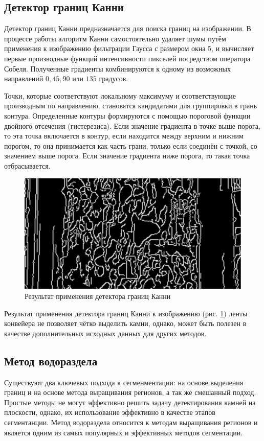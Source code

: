 \documentclass[times]{itmo-student-thesis}
\begin{document}
\subsection{Детектор границ Канни}\label{Canny}
Детектор границ Канни предназначается для поиска границ на изображении. В процессе работы алгоритм Канни самостоятельно удаляет шумы путём применения к изображению фильтрации Гаусса с размером окна 5, и вычисляет первые производные функций интенсивности пикселей посредством оператора Собеля. Полученные градиенты комбинируются к одному из возможных направлений $0, 45, 90$ или $135$ градусов. 

Точки, которые соответствуют локальному максимуму  и соответствующие производным по направлению, становятся кандидатами для группировки в грань контура. Определенные контуры формируются с помощью пороговой функции двойного отсечения (гистерезиса). Если значение градиента в точке выше порога, то эта точка включается в контур, если находится между верхним и нижним порогом, то она принимается как часть грани, только если соединён с точкой, со значением выше порога. Если значение градиента ниже порога, то такая точка отбрасывается. 

\begin{figure}[h!]
	\centering
	\includegraphics[width=0.7\linewidth]{images/canny}
	\caption{Результат применения детектора границ Канни}
	\label{fig:canny}
\end{figure}

Результат применения детектора границ Канни к изображению (рис. \ref{fig:canny}) ленты конвейера не позволяет чётко выделить камни, однако, может быть полезен в качестве дополнительных исходных данных для других методов. 

\subsection{Метод водораздела}
 Существуют два ключевых подхода к сегменментации: на основе выделения границ и на основе метода выращивания регионов, а так же смешанный подход.
Простые методы не могут эффективно решить задачу детектирования камней на плоскости, однако, их использование эффективно в качестве этапов сегментанции. Метод водораздела относится к методам выращивания регионов и является одним из самых популярных и эффективных методов сегментации\cite{watershed}.
\end{document}
